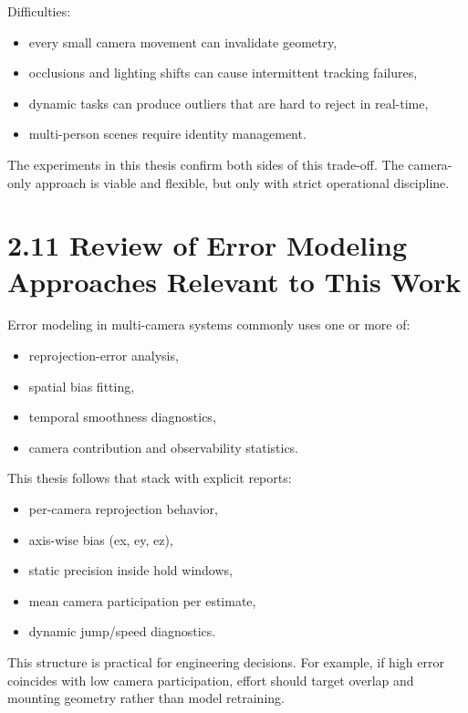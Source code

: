Difficulties:
\begin{itemize}
  \item every small camera movement can invalidate geometry,
  \item occlusions and lighting shifts can cause intermittent tracking failures,
  \item dynamic tasks can produce outliers that are hard to reject in real-time,
  \item multi-person scenes require identity management.
\end{itemize}

The experiments in this thesis confirm both sides of this trade-off. The camera-only approach is viable and flexible, but only with strict operational discipline.

\section{2.11 Review of Error Modeling Approaches Relevant to This Work}
Error modeling in multi-camera systems commonly uses one or more of:
\begin{itemize}
  \item reprojection-error analysis,
  \item spatial bias fitting,
  \item temporal smoothness diagnostics,
  \item camera contribution and observability statistics.
\end{itemize}

This thesis follows that stack with explicit reports:
\begin{itemize}
  \item per-camera reprojection behavior,
  \item axis-wise bias (ex, ey, ez),
  \item static precision inside hold windows,
  \item mean camera participation per estimate,
  \item dynamic jump/speed diagnostics.
\end{itemize}

This structure is practical for engineering decisions. For example, if high error coincides with low camera participation, effort should target overlap and mounting geometry rather than model retraining.

